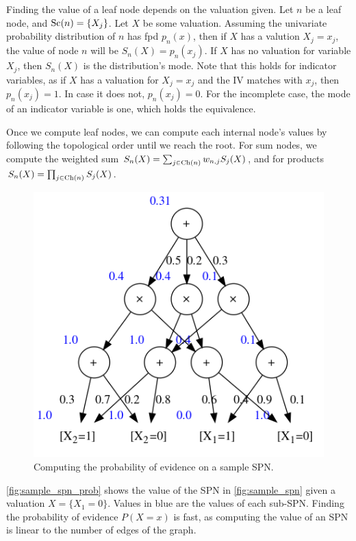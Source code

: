 Finding the value of a leaf node depends on the valuation given. Let $n$ be a leaf node, and
$\operatorname*{\text{Sc}}(n)=\{X_j\}$. Let $X$ be some valuation. Assuming the univariate probability distribution of
$n$ has fpd $p_n(x)$, then if $X$ has a valution $X_j=x_j$, the value of node $n$ will be
$S_n(X)=p_n(x_j)$. If $X$ has no valuation for variable $X_j$, then $S_n(X)$ is the
distribution's mode. Note that this holds for indicator variables, as if $X$ has a valuation for
$X_j=x_j$ and the IV matches with $x_j$, then $p_n(x_j)=1$. In case it does not, $p_n(x_j)=0$. For
the incomplete case, the mode of an indicator variable is one, which holds the equivalence.

Once we compute leaf nodes, we can compute each internal node's values by following the topological
order until we reach the root. For sum nodes, we compute the weighted sum
$S_n(X)=\sum_{j\in\operatorname*{\text{Ch}}(n)}w_{n,j}S_j(X)$, and for products $S_n(X)=\prod_{j\in\operatorname*{\text{Ch}}(n)}S_j(X)$.

\begin{figure}[h]
  \centering\includegraphics[scale=0.6]{graphs/sample_spn_prob.png}
  \caption{Computing the probability of evidence on a sample SPN.\label{fig:sample_spn_prob}}
\end{figure}

\autoref{fig:sample_spn_prob} shows the value of the SPN in \autoref{fig:sample_spn} given a
valuation $X=\{X_1=0\}$. Values in blue are the values of each sub-SPN\@. Finding the probability
of evidence $P(X=x)$ is fast, as computing the value of an SPN is linear to the number of edges of
the graph.

